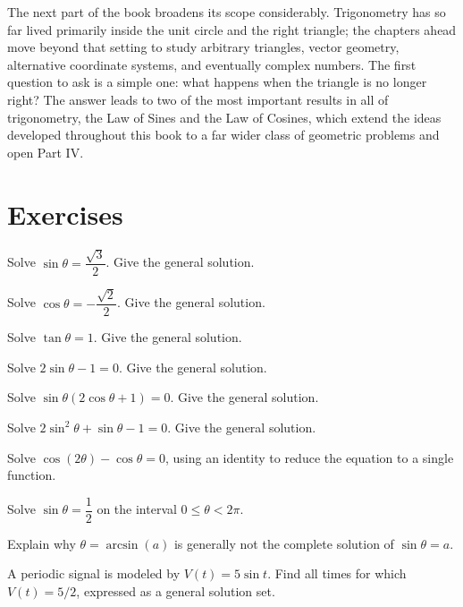 The next part of the book broadens its scope considerably. Trigonometry
has so far lived primarily inside the unit circle and the right triangle;
the chapters ahead move beyond that setting to study arbitrary triangles,
vector geometry, alternative coordinate systems, and eventually complex
numbers. The first question to ask is a simple one: what happens when the
triangle is no longer right? The answer leads to two of the most important
results in all of trigonometry, the Law of Sines and the Law of Cosines,
which extend the ideas developed throughout this book to a far wider class
of geometric problems and open Part IV.

\section{Exercises}
\begin{exercise}
Solve $\sin\theta = \dfrac{\sqrt3}{2}$. Give the general solution.
\end{exercise}

\begin{exercise}
Solve $\cos\theta = -\dfrac{\sqrt2}{2}$. Give the general solution.
\end{exercise}

\begin{exercise}
Solve $\tan\theta = 1$. Give the general solution.
\end{exercise}

\begin{exercise}
Solve $2\sin\theta - 1 = 0$. Give the general solution.
\end{exercise}

\begin{exercise}
Solve $\sin\theta(2\cos\theta + 1) = 0$. Give the general solution.
\end{exercise}

\begin{exercise}
Solve $2\sin^2\theta + \sin\theta - 1 = 0$. Give the general solution.
\end{exercise}

\begin{exercise}
Solve $\cos(2\theta) - \cos\theta = 0$, using an identity to reduce the
equation to a single function.
\end{exercise}

\begin{exercise}
Solve $\sin\theta = \dfrac12$ on the interval $0 \le \theta < 2\pi$.
\end{exercise}

\begin{exercise}
Explain why $\theta = \arcsin(a)$ is generally not the complete solution of
$\sin\theta = a$.
\end{exercise}

\begin{exercise}
A periodic signal is modeled by $V(t) = 5\sin t$. Find all times for which
$V(t) = 5/2$, expressed as a general solution set.
\end{exercise}
